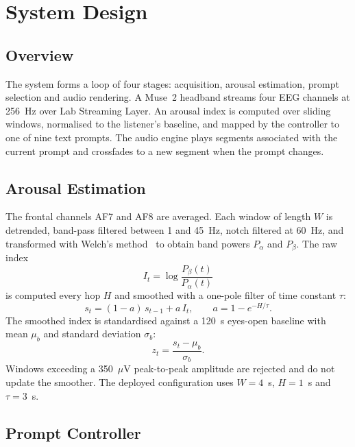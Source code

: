 \documentclass[11pt,a4paper]{article}
\begin{document}
\section{System Design}
\label{sec:system}

\subsection{Overview}

The system forms a loop of four stages: acquisition, arousal estimation, prompt selection
and audio rendering. A Muse~2 headband streams four EEG channels at 256~Hz over Lab
Streaming Layer. An arousal index is computed over sliding windows, normalised to the
listener's baseline, and mapped by the controller to one of nine text prompts. The audio
engine plays segments associated with the current prompt and crossfades to a new segment
when the prompt changes.

\subsection{Arousal Estimation}

The frontal channels AF7 and AF8 are averaged. Each window of length $W$ is detrended,
band-pass filtered between 1 and 45~Hz, notch filtered at 60~Hz, and transformed with
Welch's method~\cite{welch} to obtain band powers $P_\alpha$ and $P_\beta$. The raw index
\begin{equation}
  I_t = \log \frac{P_\beta(t)}{P_\alpha(t)}
\end{equation}
is computed every hop $H$ and smoothed with a one-pole filter of time constant $\tau$:
\begin{equation}
  s_t = (1-a)\,s_{t-1} + a\,I_t, \qquad a = 1 - e^{-H/\tau}.
\end{equation}
The smoothed index is standardised against a 120~s eyes-open baseline with mean $\mu_b$
and standard deviation $\sigma_b$:
\begin{equation}
  z_t = \frac{s_t - \mu_b}{\sigma_b}.
\end{equation}
Windows exceeding a 350~$\mu$V peak-to-peak amplitude are rejected and do not update the
smoother. The deployed configuration uses $W = 4$~s, $H = 1$~s and $\tau = 3$~s.

\subsection{Prompt Controller}
\end{document}
